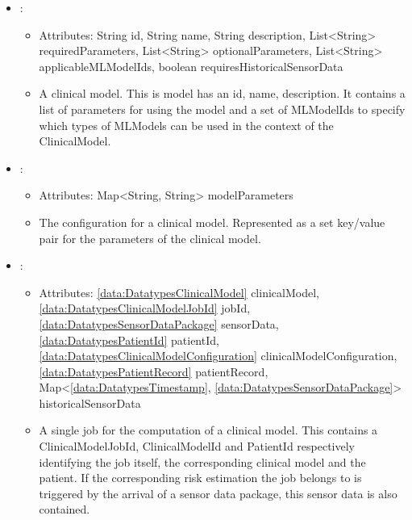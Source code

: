 \begin{itemize}[nolistsep,noitemsep]
\item {}: 
\begin{itemize}[noitemsep,nolistsep]
\item[] Attributes: String id, String name, String description, List\textless{}String\textgreater{} requiredParameters, List\textless{}String\textgreater{} optionalParameters, List\textless{}String\textgreater{} applicableMLModelIds, boolean requiresHistoricalSensorData
\item[] A clinical model. This is model has an id, name, description.
It contains a list of  parameters for using the model and a set of MLModelIds to specify which types of MLModels can be used in the context of the ClinicalModel.

\end{itemize}

\item {}: 
\begin{itemize}[noitemsep,nolistsep]
\item[] Attributes: Map\textless{}String, String\textgreater{} modelParameters
\item[] The configuration for a clinical model. Represented as a set key/value pair for the parameters of the clinical model.
\end{itemize}

\item {}: 
\begin{itemize}[noitemsep,nolistsep]
\item[] Attributes: \ref{data:DatatypesClinicalModel} clinicalModel, \ref{data:DatatypesClinicalModelJobId} jobId, \ref{data:DatatypesSensorDataPackage} sensorData, \ref{data:DatatypesPatientId} patientId, \ref{data:DatatypesClinicalModelConfiguration} clinicalModelConfiguration, \ref{data:DatatypesPatientRecord} patientRecord, Map\textless{}\ref{data:DatatypesTimestamp}, \ref{data:DatatypesSensorDataPackage}\textgreater{} historicalSensorData
\item[] A single job for the computation of a clinical model. This contains a ClinicalModelJobId, ClinicalModelId and PatientId respectively identifying the job itself, the corresponding clinical model and the patient. If the corresponding risk estimation the job belongs to is triggered by the arrival of a sensor data package, this sensor data is also contained.
\end{itemize}


\end{itemize}
